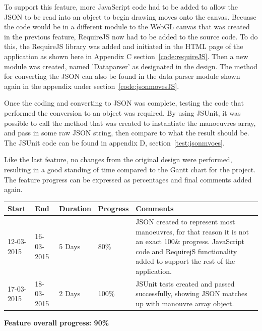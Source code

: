 To support this feature, more JavaScript code had to be added to allow the JSON to be read into an object to begin drawing moves onto the canvas. Becuase the code would be in a different module to the WebGL canvas that was created in the previous feature, RequireJS now had to be added to the source code. To do this, the RequireJS library was added and initiated in the HTML page of the application as shown here in Appendix C section~\ref{code:requireJS}. Then a new module was created, named 'Dataparser' as designated in the design. The method for converting the JSON can also be found in the data parser module shown again in the appendix under section~\ref{code:jsonmovesJS}.

Once the coding and converting to JSON was complete, testing the code that performed the conversion to an object was required. By using JSUnit, it was possible to call the method that was created to instantiate the manoeuvres array, and pass in some raw JSON string, then compare to what the result should be. The JSUnit code can be found in appendix D, section~\ref{test:jsonmvoes}.

Like the last feature, no changes from the original design were performed, resulting in a good standing of time compared to the Gantt chart for the project. The feature progress can be expressed as percentages and final comments added again.

\begin{table}[h]
\begin{tabular}{|l|l|l|l|p{7cm}|}
\hline
\textbf{Start} & \textbf{End} & \textbf{Duration} & \textbf{Progress} & \textbf{Comments}                                                                                                     \\ \hline
12-03-2015     & 16-03-2015   & 5 Days            & 80\%             & JSON created to represent most manoeuvres, for that reason it is not an exact 100\& progress. JavaScript code and RequirejS functionality added to support the rest of the application. \\ \hline
17-03-2015     & 18-03-2015   & 2 Days            & 100\%             & JSUnit tests created and passed successfully, showing JSON matches up with manouvre array object.\\ \hline
\end{tabular}
\end{table}

\textbf{Feature overall progress: 90\%}

